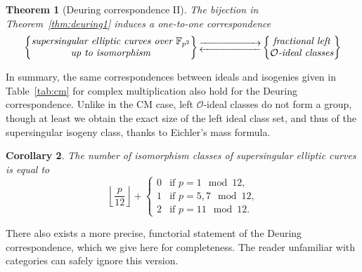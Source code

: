\documentclass[10pt]{article}
\theoremstyle{plain}
\newtheorem{theorem}{Theorem}
\newtheorem{corollary}[theorem]{Corollary}
\theoremstyle{definition}
\def\F{\ensuremath{\mathbb{F}}}
\def\O{\ensuremath{\mathcal{O}}}
\begin{document}
\begin{theorem}[Deuring correspondence II]
The bijection in Theorem~\ref{thm:deuring1} induces a one-to-one
correspondence
    \begin{equation*}
        \left\{
            \begin{tabular}{@{} c @{}}
                \emph{supersingular elliptic curves over $\F_{p^2}$}\\
                \emph{up to isomorphism}
            \end{tabular}
        \right\}
        \begin{gathered}
            \overset{}{\xrightarrow{\hspace*{2cm}}} \\[-2ex]
            \underset{}{\xleftarrow{\hspace*{2cm}}}
        \end{gathered}
        \left\{
            \begin{tabular}{@{} c @{}}
                \emph{fractional left} \\
                $\O$\emph{-ideal classes}
            \end{tabular}
        \right\}
    \end{equation*}
\end{theorem}

In summary, the same correspondences between ideals and isogenies
given in Table~\ref{tab:cm} for complex multiplication also hold for
the Deuring correspondence. %
Unlike in the CM case, left $\O$-ideal classes do not form a group,
though at least we obtain the exact size of the left ideal class set,
and thus of the supersingular isogeny class, thanks to Eichler's mass
formula. %

\begin{corollary}\label{cor:eichlermass}
  The number of isomorphism classes of supersingular elliptic curves
  is equal to
  \begin{equation*}
    \left\lfloor\frac{p}{12}\right\rfloor +
    \begin{cases}
      0 &\text{if $p=1\mod 12$,}\\
      1 &\text{if $p=5,7\mod 12$,}\\
      2 &\text{if $p=11\mod 12$.}
    \end{cases}
  \end{equation*}
\end{corollary}

There also exists a more precise, functorial statement of the Deuring
correspondence, which we give here for completeness. %
The reader unfamiliar with categories can safely ignore this version.
\end{document}
